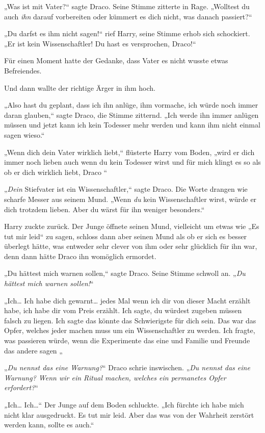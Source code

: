 {„Was ist mit Vater?“ sagte Draco. Seine Stimme zitterte in Rage. „Wolltest du auch \emph{ihn} darauf vorbereiten oder kümmert es dich nicht, was danach passiert?“

„Du darfst es ihm nicht sagen!“ rief Harry, seine Stimme erhob sich schockiert. „Er ist kein Wissenschaftler! Du hast es versprochen, Draco!“

Für einen Moment hatte der Gedanke, dass Vater es nicht wusste etwas Befreiendes.

Und dann wallte der richtige Ärger in ihm hoch.

„Also hast du geplant, dass ich ihn anlüge, ihm vormache, ich würde noch immer daran glauben,“ sagte Draco, die Stimme zitternd. „Ich werde ihn immer anlügen müssen und jetzt kann ich kein Todesser mehr werden und kann ihm nicht einmal sagen wieso.“

„Wenn dich dein Vater wirklich liebt,“ flüsterte Harry vom Boden, „wird er dich immer noch lieben auch wenn du kein Todesser wirst und für mich klingt es so als ob er dich wirklich liebt, Draco \later“

„\emph{Dein} Stiefvater ist ein Wissenschaftler,“ sagte Draco. Die Worte drangen wie scharfe Messer aus seinem Mund. „Wenn \emph{du} kein Wissenschaftler wirst, würde er dich trotzdem lieben. Aber du wärst für ihn weniger besonders.“

Harry zuckte zurück. Der Junge öffnete seinen Mund, vielleicht um etwas wie „Es tut mir leid“ zu sagen, schloss dann aber seinen Mund als ob er sich es besser überlegt hätte, was entweder sehr clever von ihm oder sehr glücklich für ihn war, denn dann hätte Draco ihn womöglich ermordet.

„Du hättest mich warnen sollen,“ sagte Draco. Seine Stimme schwoll an. „\emph{Du hättest mich warnen sollen!}“

„Ich… Ich habe dich gewarnt… jedes Mal wenn ich dir von dieser Macht erzählt habe, ich habe dir vom Preis erzählt. Ich sagte, du würdest zugeben müssen falsch zu liegen. Ich sagte das könnte das Schwierigste für dich sein. Das war das Opfer, welches jeder machen muss um ein Wissenschaftler zu werden. Ich fragte, was passieren würde, wenn die Experimente das eine und Familie und Freunde das andere sagen \later„

„\emph{Du nennst das eine Warnung?}“ Draco schrie inswischen. „\emph{Du nennst das eine Warnung? Wenn wir ein Ritual machen, welches ein permanetes Opfer erfordert?}“

\emph{„}Ich… Ich…“ Der Junge auf dem Boden schluckte. „Ich fürchte ich habe mich nicht klar ausgedruckt. Es tut mir leid. Aber das was von der Wahrheit zerstört werden kann, sollte es auch.“

}
